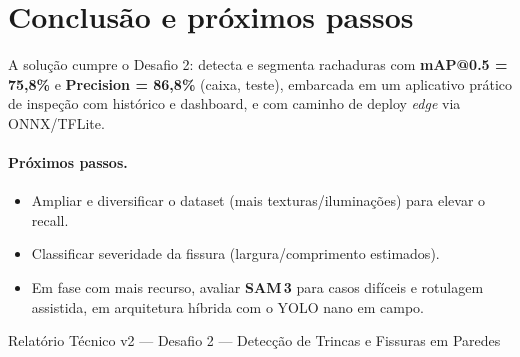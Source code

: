 \documentclass[11pt,a4paper]{article}
\begin{document}
\section{Conclusão e próximos passos}
A solução cumpre o Desafio 2: detecta e segmenta rachaduras com \textbf{mAP@0.5 = 75,8\%} e
\textbf{Precision = 86,8\%} (caixa, teste), embarcada em um aplicativo prático de inspeção com
histórico e dashboard, e com caminho de deploy \emph{edge} via ONNX/TFLite.

\paragraph{Próximos passos.}
\begin{itemize}[leftmargin=1.4em]
  \item Ampliar e diversificar o dataset (mais texturas/iluminações) para elevar o recall.
  \item Classificar severidade da fissura (largura/comprimento estimados).
  \item Em fase com mais recurso, avaliar \textbf{SAM\,3} para casos difíceis e rotulagem
        assistida, em arquitetura híbrida com o YOLO nano em campo.
\end{itemize}

\vfill
\begin{center}\small\color{graytxt}
Relatório Técnico v2 — Desafio 2 — Detecção de Trincas e Fissuras em Paredes
\end{center}
\end{document}
